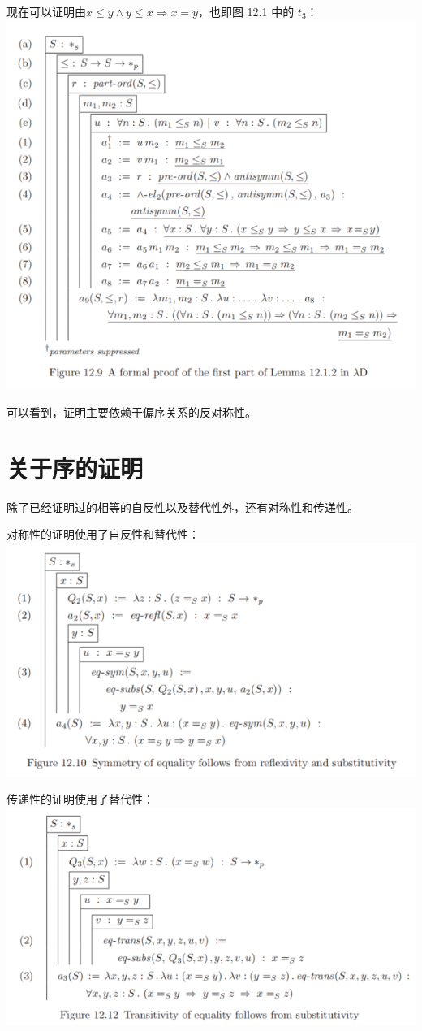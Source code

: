 \documentclass[UTF8]{article}
\begin{document}
		现在可以证明由$x\le y\land y\le x\Rightarrow x=y$，也即图 12.1 中的 $t_3$：\\
		\includegraphics[width=0.93\linewidth]{"../imgs/12-8.png"}
		
		可以看到，证明主要依赖于偏序关系的反对称性。
		
	\section{关于序的证明}
	\noindent
	除了已经证明过的相等的自反性以及替代性外，还有对称性和传递性。
	
		对称性的证明使用了自反性和替代性：\\
		\includegraphics[width=0.93\linewidth]{"../imgs/12-9.png"}
		
		传递性的证明使用了替代性：\\
		\includegraphics[width=0.93\linewidth]{"../imgs/12-10.png"}
		
\end{document}
